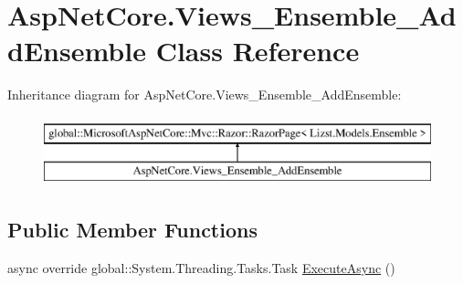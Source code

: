 \hypertarget{class_asp_net_core_1_1_views___ensemble___add_ensemble}{}\section{Asp\+Net\+Core.\+Views\+\_\+\+Ensemble\+\_\+\+Add\+Ensemble Class Reference}
\label{class_asp_net_core_1_1_views___ensemble___add_ensemble}
Inheritance diagram for Asp\+Net\+Core.\+Views\+\_\+\+Ensemble\+\_\+\+Add\+Ensemble\+:\begin{figure}[H]
\begin{center}
\leavevmode
\includegraphics[height=2.000000cm]{class_asp_net_core_1_1_views___ensemble___add_ensemble}
\end{center}
\end{figure}
\subsection*{Public Member Functions}
\begin{DoxyCompactItemize}
\item 
async override global\+::\+System.\+Threading.\+Tasks.\+Task \mbox{\hyperlink{class_asp_net_core_1_1_views___ensemble___add_ensemble_a7d9fa1316742288d873e76867d34f9ab}{Execute\+Async}} ()
\end{DoxyCompactItemize}
